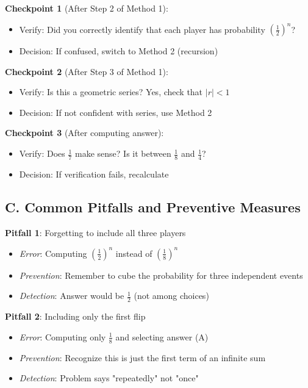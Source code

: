 \documentclass[11pt]{article}
\begin{document}
\begin{roadmapbox}
\textbf{Checkpoint 1} (After Step 2 of Method 1):
\begin{itemize}
    \item Verify: Did you correctly identify that each player has probability $\left(\frac{1}{2}\right)^n$?
    \item Decision: If confused, switch to Method 2 (recursion)
\end{itemize}

\textbf{Checkpoint 2} (After Step 3 of Method 1):
\begin{itemize}
    \item Verify: Is this a geometric series? Yes, check that $|r| < 1$
    \item Decision: If not confident with series, use Method 2
\end{itemize}

\textbf{Checkpoint 3} (After computing answer):
\begin{itemize}
    \item Verify: Does $\frac{1}{7}$ make sense? Is it between $\frac{1}{8}$ and $\frac{1}{4}$?
    \item Decision: If verification fails, recalculate
\end{itemize}

\subsection*{C. Common Pitfalls and Preventive Measures}

\textbf{Pitfall 1}: Forgetting to include all three players
\begin{itemize}
    \item \textit{Error}: Computing $\left(\frac{1}{2}\right)^n$ instead of $\left(\frac{1}{8}\right)^n$
    \item \textit{Prevention}: Remember to cube the probability for three independent events
    \item \textit{Detection}: Answer would be $\frac{1}{2}$ (not among choices)
\end{itemize}

\textbf{Pitfall 2}: Including only the first flip
\begin{itemize}
    \item \textit{Error}: Computing only $\frac{1}{8}$ and selecting answer (A)
    \item \textit{Prevention}: Recognize this is just the first term of an infinite sum
    \item \textit{Detection}: Problem says "repeatedly" not "once"
\end{itemize}


\end{roadmapbox}
\end{document}
